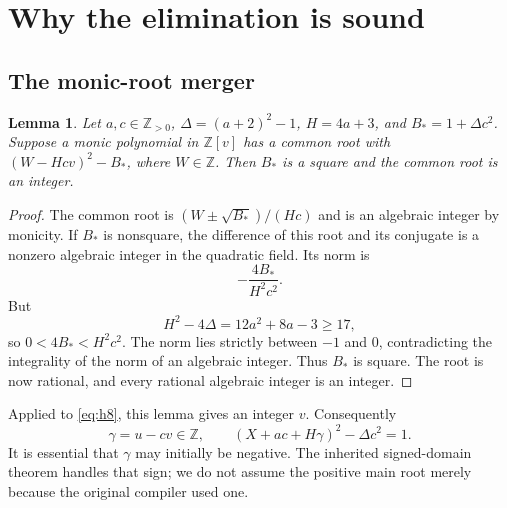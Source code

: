 \documentclass[11pt,letterpaper]{article}
\newtheorem{lemma}[theorem]{Lemma}
\theoremstyle{remark}\newtheorem{remark}[theorem]{Remark}
\newcommand{\Z}{\mathbb Z}\newcommand{\N}{\mathbb N}\newcommand{\pos}{\mathbb Z_{>0}}
\begin{document}
\section{Why the elimination is sound}\label{sec:proof}

\subsection{The monic-root merger}
\begin{lemma}\label{lem:monic}
Let $a,c\in\pos$, $\Delta=(a+2)^2-1$, $H=4a+3$, and
$B_*=1+\Delta c^2$. Suppose a monic polynomial in $\Z[v]$ has a common root
with $(W-Hcv)^2-B_*$, where $W\in\Z$. Then $B_*$ is a square and the common
root is an integer.
\end{lemma}
\begin{proof}
The common root is $(W\pm\sqrt{B_*})/(Hc)$ and is an algebraic integer by
monicity. If $B_*$ is nonsquare, the difference of this root and its conjugate
is a nonzero algebraic integer in the quadratic field. Its norm is
\[
 -\frac{4B_*}{H^2c^2}.
\]
But
\[
 H^2-4\Delta=12a^2+8a-3\geq17,
\]
so $0<4B_*<H^2c^2$. The norm lies strictly between $-1$ and $0$, contradicting
the integrality of the norm of an algebraic integer. Thus $B_*$ is square.
The root is now rational, and every rational algebraic integer is an integer.
\end{proof}

Applied to \eqref{eq:h8}, this lemma gives an integer $v$. Consequently
\begin{equation}\label{eq:restoregamma}
 \gamma=u-cv\in\Z,
 \qquad (X+ac+H\gamma)^2-\Delta c^2=1.
\end{equation}
It is essential that $\gamma$ may initially be negative. The inherited
signed-domain theorem handles that sign; we do not assume the positive main
root merely because the original compiler used one.
\end{document}
